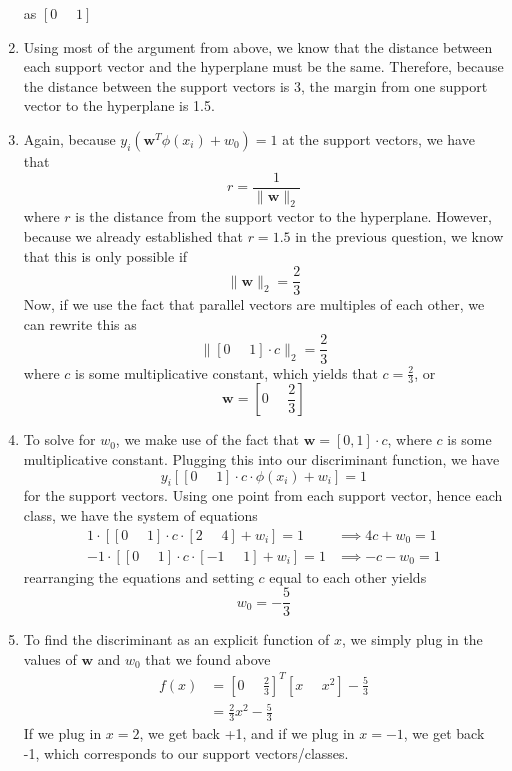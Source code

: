 \documentclass[submit]{harvardml}
\begin{document}
\begin{enumerate}
		as $\left[0 \text{      {} } 1\right]$
	\item Using most of the argument from above, we know that the distance between each support vector 
		and the hyperplane must be the same. Therefore, because the distance between the support vectors 
		is 3, the margin from one support vector to the hyperplane is 1.5.
	\item Again, because $y_i(\mathbf{w}^T\phi(x_i) + w_0) = 1$ at the support vectors, we have that 
		$$ r = \frac{1}{\|\mathbf{w}\|_2}$$
		where $r$ is the distance from the support vector to the hyperplane. However, because we already established 
		that $r = 1.5$ in the previous question, we know that this is only possible if 
			$$\|\mathbf{w}\|_2 = \frac{2}{3}$$
		Now, if we use the fact that parallel vectors are multiples of each other, we can rewrite this as 
			$$\| \left[0 \text{      {} } 1\right] \cdot c\|_2 = \frac{2}{3}$$	
		where $c$ is some multiplicative constant, which yields that $c = \frac{2}{3}$, or 
			$$\mathbf{w} = \left[0 \text{      {} }  \frac{2}{3}\right]$$	
	\item To solve for $w_0$, we make use of the fact that $\mathbf{w} = \left[0, 1\right]\cdot c$, where $c$ is some
		multiplicative constant. Plugging this into our discriminant function, we have 
			$$y_i[\left[0 \text{      {} } 1\right] \cdot c \cdot \phi(x_i) + w_i] = 1$$
		for the support vectors. Using one point from each support vector, hence each class, we have the 
		system of equations
			\begin{align*}
				1 \cdot [\left[0 \text{      {} } 1\right] \cdot c \cdot \left[2 \text{      {} } 4\right]+ w_i] = 1 &\implies 4c + w_0 = 1\\
				-1 \cdot [\left[0 \text{      {} } 1\right] \cdot c \cdot \left[-1 \text{      {} } 1\right]+ w_i] = 1 & \implies -c -w_0 = 1
			\end{align*}
		rearranging the equations and setting $c$ equal to each other yields 
			$$w_0 = -\frac{5}{3}$$
	\item To find the discriminant as an explicit function of $x$, we simply plug in the values of $\mathbf{w}$ and 
		$w_0$ that we found above
			\begin{align*}
				f(x) &= \left[0 \text{      {} }  \frac{2}{3}\right]^T [x \text{      {} }  x^2] - \frac{5}{3} \\ 
				&= \frac{2}{3}x^2 - \frac{5}{3}
			\end{align*}
		If we plug in $x = 2$, we get back +1, and if we plug in $x = -1$, we get back -1, which corresponds to 
		our support vectors/classes. 
\end{enumerate}
\end{document}

